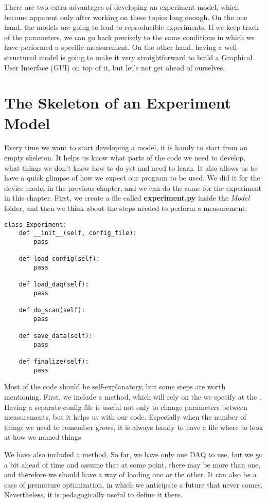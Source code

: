 There are two extra advantages of developing an experiment model, which become apparent only after working on these topics long enough. On the one hand, the models are going to lead to reproducible experiments. If we keep track of the parameters, we can go back precisely to the same conditions in which we have performed a specific measurement. On the other hand, having a well-structured model is going to make it very straightforward to build a Graphical User Interface ({GUI}) on top of it, but let's not get ahead of ourselves.

\section{The Skeleton of an Experiment Model}\label{sec:skeleton-experiment-model}
Every time we want to start developing a model, it is handy to start from an empty skeleton. It helps us know what parts of the code we need to develop, what things we don't know how to do yet and need to learn. It also allows us to have a quick glimpse of how we expect our program to be used. We did it for the device model in the previous chapter, and we can do the same for the experiment in this chapter. First, we create a file called \textbf{experiment.py} inside the \emph{Model} folder, and then we think about the steps needed to perform a measurement:

\begin{verbatim}
class Experiment:
    def __init__(self, config_file):
        pass

    def load_config(self):
        pass

    def load_daq(self):
        pass

    def do_scan(self):
        pass

    def save_data(self):
        pass

    def finalize(self):
        pass

\end{verbatim}

Most of the code should be self-explanatory, but some steps are worth mentioning. First, we include a  method, which will rely on the  we specify at the . Having a separate config file is useful not only to change parameters between measurements, but it helps us with our code. Especially when the number of things we need to remember grows, it is always handy to have a file where to look at how we named things.

We have also included a  method. So far, we have only one DAQ to use, but we go a bit ahead of time and assume that at some point, there may be more than one, and therefore we should have a way of loading one or the other. It can also be a case of premature optimization, in which we anticipate a future that never comes. Nevertheless, it is pedagogically useful to define it there.

